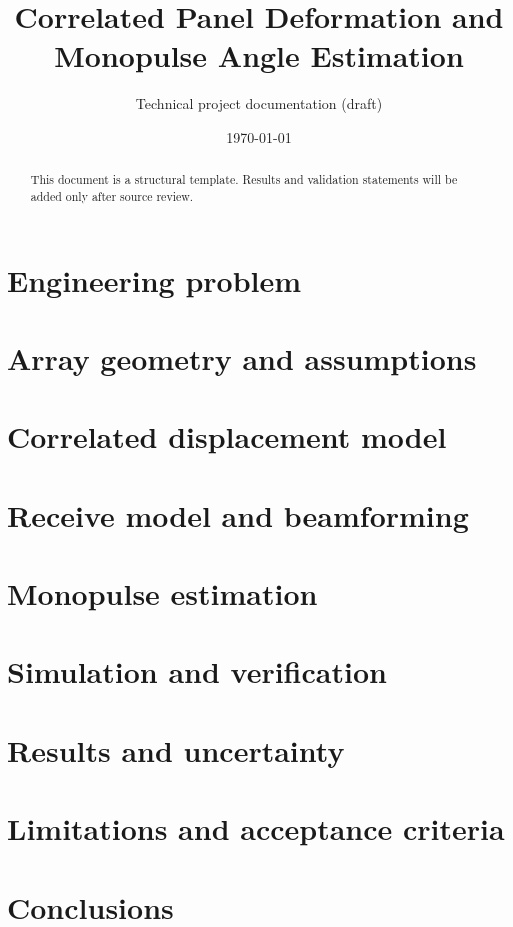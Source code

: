 \documentclass[11pt,a4paper]{article}
\title{Correlated Panel Deformation and Monopulse Angle Estimation}
\author{Technical project documentation (draft)}
\date{\today}
\begin{document}
\maketitle
\begin{abstract}
This document is a structural template. Results and validation statements will be added only after source review.
\end{abstract}
\section{Engineering problem}
\section{Array geometry and assumptions}
\section{Correlated displacement model}
\section{Receive model and beamforming}
\section{Monopulse estimation}
\section{Simulation and verification}
\section{Results and uncertainty}
\section{Limitations and acceptance criteria}
\section{Conclusions}
\end{document}
